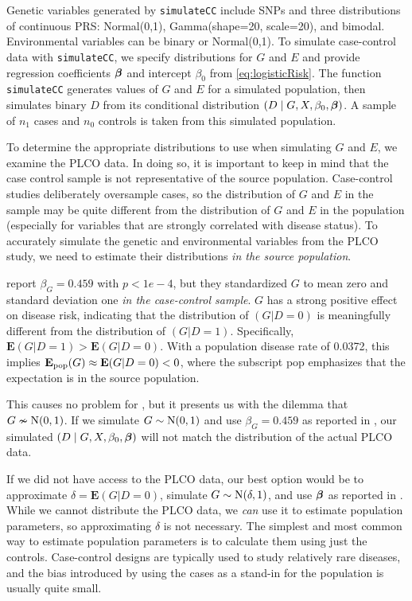 \documentclass[11pt,]{article}
\begin{document}
Genetic variables generated by \texttt{simulateCC} include SNPs and
three distributions of continuous PRS: Normal(0,1), Gamma(shape=20,
scale=20), and bimodal. Environmental variables can be binary or
Normal(0,1). To simulate case-control data with \texttt{simulateCC}, we
specify distributions for \(G\) and \(E\) and provide regression
coefficients \(\mbox{\boldmath $\beta$}\) and intercept \(\beta_0\) from
\cref{eq:logisticRisk}. The function \texttt{simulateCC} generates
values of \(G\) and \(E\) for a simulated population, then simulates
binary \(D\) from its conditional distribution
\((D \mid G, X, \beta_0, \mbox{\boldmath $\beta$})\). A sample of \(n_1\) cases and
\(n_0\) controls is taken from this simulated population.

To determine the appropriate distributions to use when simulating \(G\)
and \(E\), we examine the PLCO data. In doing so, it is important to
keep in mind that the case control sample is not representative of the
source population. Case-control studies deliberately oversample cases,
so the distribution of \(G\) and \(E\) in the sample may be quite
different from the distribution of \(G\) and \(E\) in the population
(especially for variables that are strongly correlated with disease
status). To accurately simulate the genetic and environmental variables
from the PLCO study, we need to estimate their distributions
\emph{in the source population}.

\citeauthor{Wang2018unpublished} report \(\beta_G = 0.459\) with
\(p < 1e-4\), but they standardized \(G\) to mean zero and standard
deviation one \emph{in the case-control sample}. \(G\) has a strong
positive effect on disease risk, indicating that the distribution of
\((G|D=0)\) is meaningfully different from the distribution of
\((G|D=1)\). Specifically, \(\mathbf{E}(G|D=1) > \mathbf{E}(G|D=0)\).
With a population disease rate of 0.0372, this implies
\(\mathbf{E_{\rm pop}}(G) \approx \mathbf{E}(G|D=0) < 0\), where the
subscript pop emphasizes that the expectation is in the source
population.

This causes no problem for \citeauthor{Wang2018unpublished}, but it
presents us with the dilemma that \(G \nsim \hbox{N}(0,1)\). If we
simulate \(G \sim \hbox{N}(0,1)\) and use \(\beta_G = 0.459\) as
reported in \citeauthor{Wang2018unpublished}, our simulated
\((D \mid G, X, \beta_0, \mbox{\boldmath $\beta$})\) will not match the distribution of
the actual PLCO data.

If we did not have access to the PLCO data, our best option would be to
approximate \(\delta = \mathbf{E}(G|D=0)\), simulate
\(G \sim \hbox{N}(\delta, 1)\), and use \(\mbox{\boldmath $\beta$}\) as reported in
\citeauthor{Wang2018unpublished}. While we cannot distribute the PLCO
data, we \emph{can} use it to estimate population parameters, so
approximating \(\delta\) is not necessary. The simplest and most common
way to estimate population parameters is to calculate them using just
the controls. Case-control designs are typically used to study
relatively rare diseases, and the bias introduced by using the cases as
a stand-in for the population is usually quite small.
\end{document}
